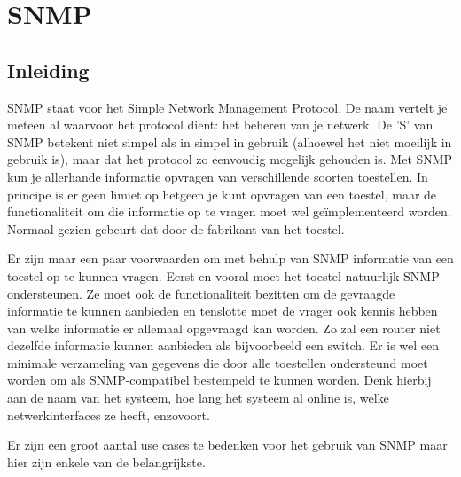 \chapter{SNMP}

\section{Inleiding}

SNMP staat voor het Simple Network Management Protocol. De naam vertelt je meteen al waarvoor het protocol dient: het beheren van je netwerk.
De 'S' van SNMP betekent niet simpel als in simpel in gebruik (alhoewel het niet moeilijk in gebruik is), maar dat het protocol zo eenvoudig mogelijk gehouden is.
Met SNMP kun je allerhande informatie opvragen van verschillende soorten toestellen. In principe is er geen limiet op hetgeen je kunt opvragen van een toestel,
maar de functionaliteit om die informatie op te vragen moet wel geïmplementeerd worden. Normaal gezien gebeurt dat door de fabrikant van het toestel.

Er zijn maar een paar voorwaarden om met behulp van SNMP informatie van een toestel op te kunnen vragen. Eerst en vooral moet het toestel natuurlijk SNMP ondersteunen.
Ze moet ook de functionaliteit bezitten om de gevraagde informatie te kunnen aanbieden en tenslotte moet de vrager ook kennis hebben van welke informatie
er allemaal opgevraagd kan worden. Zo zal een router niet dezelfde informatie kunnen aanbieden als bijvoorbeeld een switch. Er is wel een minimale
verzameling van gegevens die door alle toestellen ondersteund moet worden om als SNMP-compatibel bestempeld te kunnen worden. Denk hierbij aan de naam van het
systeem, hoe lang het systeem al online is, welke netwerkinterfaces ze heeft, enzovoort.

Er zijn een groot aantal use cases te bedenken voor het gebruik van SNMP maar hier zijn enkele van de belangrijkste.


